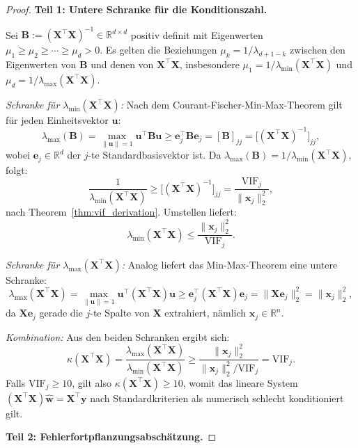 ﻿\documentclass[12pt, a4paper]{article}
\theoremstyle{definition}
\theoremstyle{remark}
\newcommand{\R}{\mathbb{R}}
\newcommand{\vw}{\bm{w}}
\newcommand{\vx}{\bm{x}}
\newcommand{\vy}{\bm{y}}
\newcommand{\vX}{\bm{X}}
\newcommand{\T}{\top}
\begin{document}
\begin{proof}
	\textbf{Teil 1: Untere Schranke für die Konditionszahl.}
	
	Sei $\bm{B} := (\vX^\T\vX)^{-1} \in \R^{d\times d}$ positiv definit mit Eigenwerten
	$\mu_1 \geq \mu_2 \geq \cdots \geq \mu_d > 0$. Es gelten die Beziehungen
	$\mu_k = 1/\lambda_{d+1-k}$ zwischen den Eigenwerten von $\bm{B}$ und denen von
	$\vX^\T\vX$, insbesondere $\mu_1 = 1/\lambda_{\min}(\vX^\T\vX)$ und
	$\mu_d = 1/\lambda_{\max}(\vX^\T\vX)$.
	
	\emph{Schranke für $\lambda_{\min}(\vX^\T\vX)$:}
	Nach dem Courant-Fischer-Min-Max-Theorem gilt für jeden Einheitsvektor $\bm{u}$:
	\[
	\lambda_{\max}(\bm{B}) = \max_{\|\bm{u}\|=1} \bm{u}^\T\bm{B}\bm{u}
	\geq \bm{e}_j^\T\bm{B}\bm{e}_j = [\bm{B}]_{jj}
	= \bigl[(\vX^\T\vX)^{-1}\bigr]_{jj},
	\]
	wobei $\bm{e}_j \in \R^d$ der $j$-te Standardbasisvektor ist. Da
	$\lambda_{\max}(\bm{B}) = 1/\lambda_{\min}(\vX^\T\vX)$, folgt:
	\begin{equation}
		\frac{1}{\lambda_{\min}(\vX^\T\vX)} \geq \bigl[(\vX^\T\vX)^{-1}\bigr]_{jj}
		= \frac{\mathrm{VIF}_j}{\|\vx_j\|_2^2},
		\label{eq:lambda_min_bound}
	\end{equation}
	nach Theorem~\ref{thm:vif_derivation}. Umstellen liefert:
	\[
	\lambda_{\min}(\vX^\T\vX) \leq \frac{\|\vx_j\|_2^2}{\mathrm{VIF}_j}.
	\]
	
	\emph{Schranke für $\lambda_{\max}(\vX^\T\vX)$:}
	Analog liefert das Min-Max-Theorem eine untere Schranke:
	\[
	\lambda_{\max}(\vX^\T\vX) = \max_{\|\bm{u}\|=1} \bm{u}^\T(\vX^\T\vX)\bm{u}
	\geq \bm{e}_j^\T(\vX^\T\vX)\bm{e}_j = \|\vX\bm{e}_j\|_2^2 = \|\vx_j\|_2^2,
	\]
	da $\vX\bm{e}_j$ gerade die $j$-te Spalte von $\vX$ extrahiert, nämlich $\vx_j \in \R^n$.
	
	\emph{Kombination:}
	Aus den beiden Schranken ergibt sich:
	\[
	\kappa(\vX^\T\vX)
	= \frac{\lambda_{\max}(\vX^\T\vX)}{\lambda_{\min}(\vX^\T\vX)}
	\geq \frac{\|\vx_j\|_2^2}{\|\vx_j\|_2^2 / \mathrm{VIF}_j}
	= \mathrm{VIF}_j.
	\]
	Falls $\mathrm{VIF}_j \geq 10$, gilt also $\kappa(\vX^\T\vX) \geq 10$, womit das
	lineare System $(\vX^\T\vX)\hat{\vw} = \vX^\T\vy$ nach Standardkriterien als numerisch
	schlecht konditioniert gilt.
	
	\textbf{Teil 2: Fehlerfortpflanzungsabschätzung.}
	

\end{proof}
\end{document}

